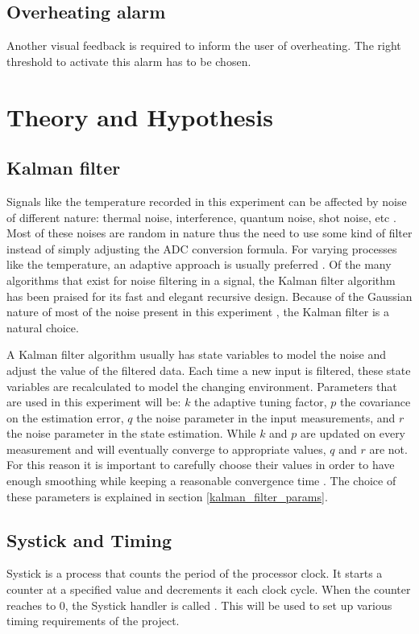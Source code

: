 \documentclass[12pt]{article}
\begin{document}
\subsection{Overheating alarm}
Another visual feedback is required to inform the user of overheating. The right threshold to activate this alarm has to be chosen.

\section{Theory and Hypothesis}
\subsection{Kalman filter}
\label{kalman_filter}
Signals like the temperature recorded in this experiment can be affected by noise of different nature: thermal noise, interference, quantum noise, shot noise, etc \cite{kuo1995active}. Most of these noises are random in nature thus the need to use some kind of filter instead of simply adjusting the ADC conversion formula. For varying processes like the temperature, an adaptive approach is usually preferred \cite{kuo1995active}. Of the many algorithms that exist for noise filtering in a signal, the Kalman filter algorithm \cite{kalman1960new} has been praised for its fast and elegant recursive design. Because of the Gaussian nature of most of the noise present in this experiment \cite{kish2000noise}, the Kalman filter is a natural choice. 

A Kalman filter algorithm usually has state variables to model the noise and adjust the value of the filtered data. Each time a new input is filtered, these state variables are recalculated to model the changing environment. Parameters that are used in this experiment will be: $k$ the  adaptive  tuning  factor, $p$ the covariance on the estimation error, $q$ the noise parameter in the  input  measurements,  and $r$ the noise parameter in the  state  estimation. While $k$ and $p$ are updated on every measurement and will eventually converge to appropriate values, $q$ and $r$ are not. For this reason it is important to carefully choose their values in order to have enough smoothing while keeping a reasonable convergence time \cite{kalman1960new}. The choice of these parameters is explained in section \ref{kalman_filter_params}.

\subsection{Systick and Timing}
Systick is a process that counts the period of the processor clock. It starts a counter at a specified value and decrements it each clock cycle. When the counter reaches to 0, the Systick handler is called \cite{STMCubeDatasheet}. This will be used to set up various timing requirements of the project.
\end{document}
